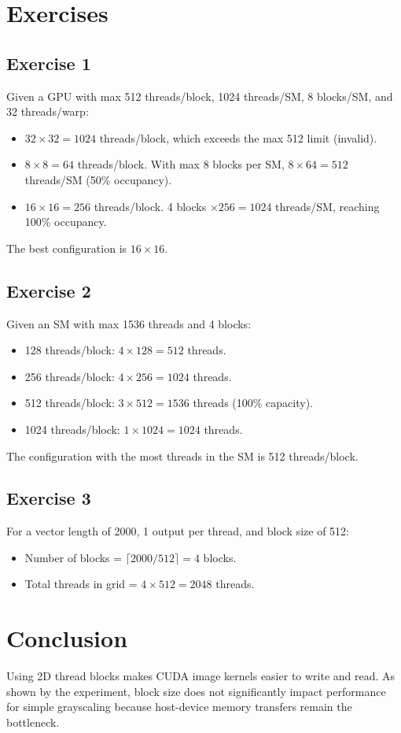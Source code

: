 \documentclass{report}
\begin{document}
\section*{Exercises}

\subsection*{Exercise 1}
Given a GPU with max 512 threads/block, 1024 threads/SM, 8 blocks/SM, and 32 threads/warp:
\begin{itemize}
    \item $32 \times 32 = 1024$ threads/block, which exceeds the max 512 limit (invalid).
    \item $8 \times 8 = 64$ threads/block. With max 8 blocks per SM, $8 \times 64 = 512$ threads/SM (50\% occupancy).
    \item $16 \times 16 = 256$ threads/block. 4 blocks $\times 256 = 1024$ threads/SM, reaching 100\% occupancy.
\end{itemize}
The best configuration is $16 \times 16$.

\subsection*{Exercise 2}
Given an SM with max 1536 threads and 4 blocks:
\begin{itemize}
    \item 128 threads/block: $4 \times 128 = 512$ threads.
    \item 256 threads/block: $4 \times 256 = 1024$ threads.
    \item 512 threads/block: $3 \times 512 = 1536$ threads (100\% capacity).
    \item 1024 threads/block: $1 \times 1024 = 1024$ threads.
\end{itemize}
The configuration with the most threads in the SM is 512 threads/block.

\subsection*{Exercise 3}
For a vector length of 2000, 1 output per thread, and block size of 512:
\begin{itemize}
    \item Number of blocks = $\lceil 2000 / 512 \rceil = 4$ blocks.
    \item Total threads in grid = $4 \times 512 = 2048$ threads.
\end{itemize}

\section*{Conclusion}

Using 2D thread blocks makes CUDA image kernels easier to write and read. As shown by the experiment, block size does not significantly impact performance for simple grayscaling because host-device memory transfers remain the bottleneck.
\end{document}
